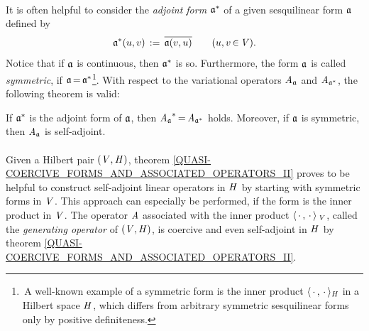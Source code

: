 \documentclass[11pt,twoside]{article}
\begin{document}
\paragraph{} %
It is often helpful to consider the \textit{adjoint form} $\mathfrak{a}^*$
of a given sesquilinear form $\mathfrak{a}$ defined by
\[
\mathfrak{a}^* (u,v) \,:=\, \overline{\mathfrak{a}(v,u)}
\quad \quad (u,v {\,\in\,} \mathit{V}).
\]
Notice that if $\mathfrak{a}$ is continuous,
then $\mathfrak{a}^*$ is so.
Furthermore,
the form $\mathfrak{a}$ is called \textit{symmetric},
if $\mathfrak{a} {\,=\,} \mathfrak{a}^*$\footnote{
\,A well-known example of a symmetric form is the inner product
$\langle \,\cdot\,,\,\cdot\, \rangle_{\mathit{H}}$ in a Hilbert space $\mathit{H}$,
which differs from arbitrary symmetric sesquilinear forms
only by positive definiteness.}.
With respect to the variational operators $\mathit{A}_{\mathfrak{a}}$ and $\mathit{A}_{\mathfrak{a}^*}$,
the following theorem is valid:

\begin{theorem1}\label{QUASI-COERCIVE_FORMS_AND_ASSOCIATED_OPERATORS_II}
If $\mathfrak{a}^*$ is the adjoint form of $\mathfrak{a}$,
then ${\mathit{A}_{\mathfrak{a}}}^* {\,=\,} \mathit{A}_{\mathfrak{a}^*}$ holds.
Moreover,
if $\mathfrak{a}$ is symmetric,
then $\mathit{A}_{\mathfrak{a}}$ is self-adjoint.
\end{theorem1}

\paragraph{} %
Given a Hilbert pair $(\mathit{V},\mathit{H})$,
theorem \ref{QUASI-COERCIVE_FORMS_AND_ASSOCIATED_OPERATORS_II}
proves to be helpful to construct self-adjoint linear operators in $\mathit{H}$
by starting with symmetric forms in $\mathit{V}$.
This approach can especially be performed,
if the form is the inner product in $\mathit{V}$.
The operator $\mathit{A}$ associated with the inner product
$\langle \,\cdot\,,\,\cdot\, \rangle_{\,\mathit{V}}$,
called the \textit{generating operator} of $(\mathit{V},\mathit{H})$,
is coercive and even self-adjoint in $\mathit{H}$
by theorem \ref{QUASI-COERCIVE_FORMS_AND_ASSOCIATED_OPERATORS_II}.
\end{document}
